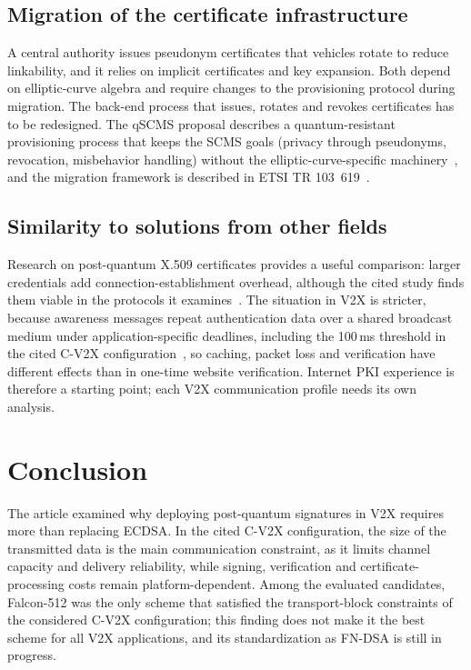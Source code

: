 \documentclass[11pt,a4paper]{article}
\begin{document}
\subsection{Migration of the certificate infrastructure}

A central authority issues pseudonym certificates that vehicles rotate to reduce linkability, and
it relies on implicit certificates and key expansion. Both depend on elliptic-curve algebra and
require changes to the provisioning protocol during migration. The back-end process that issues,
rotates and revokes certificates has to be redesigned. The qSCMS proposal describes a
quantum-resistant provisioning process that keeps the SCMS goals (privacy through pseudonyms,
revocation, misbehavior handling) without the elliptic-curve-specific machinery~\cite{barreto},
and the migration framework is described in ETSI TR 103~619~\cite{etsi619}.

\subsection{Similarity to solutions from other fields}

Research on post-quantum X.509 certificates provides a useful comparison: larger credentials add
connection-establishment overhead, although the cited study finds them viable in the protocols it
examines~\cite{kampanakis}. The situation in V2X is stricter, because awareness messages repeat
authentication data over a shared broadcast medium under application-specific deadlines,
including the 100\,ms threshold in the cited C-V2X configuration~\cite{abrar}, so caching, packet
loss and verification have different effects than in one-time website verification. Internet PKI
experience is therefore a starting point; each V2X communication profile needs its own analysis.

\section{Conclusion}
\label{sec:conclusion}

The article examined why deploying post-quantum signatures in V2X requires more than replacing
ECDSA. In the cited C-V2X configuration, the size of the transmitted data is the main
communication constraint, as it limits channel capacity and delivery reliability, while signing,
verification and certificate-processing costs remain platform-dependent. Among the evaluated
candidates, Falcon-512 was the only scheme that satisfied the transport-block constraints of the
considered C-V2X configuration; this finding does not make it the best scheme for all V2X
applications, and its standardization as FN-DSA is still in progress.
\end{document}
